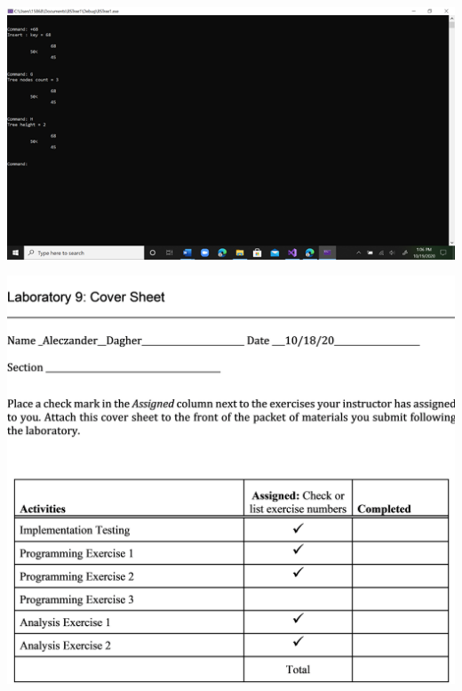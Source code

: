 \begin{DoxyImageNoCaption}
  \mbox{\includegraphics[width=17cm]{Lab9Test3.png}}
\end{DoxyImageNoCaption}



\begin{DoxyImageNoCaption}
  \mbox{\includegraphics[width=17cm]{Lab9Sheet1.png}}
\end{DoxyImageNoCaption}



